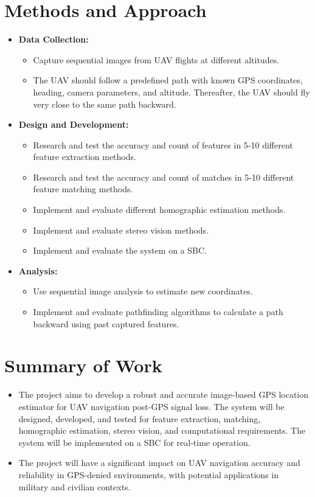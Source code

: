\section{Methods and Approach}
\begin{itemize}
    \item \textbf{Data Collection:}
    \begin{itemize}
        \item Capture sequential images from UAV flights at different altitudes.
        \item The UAV should follow a predefined path with known GPS coordinates, heading, camera parameters, and altitude. Thereafter, the UAV should fly very close to the same path backward.
    \end{itemize}
    \item \textbf{Design and Development:}
    \begin{itemize}
        \item Research and test the accuracy and count of features in 5-10 different feature extraction methods. 
        \item Research and test the accuracy and count of matches in 5-10 different feature matching methods.
        \item Implement and evaluate different homographic estimation methods. 
        \item Implement and evaluate stereo vision methods.
        \item Implement and evaluate the system on a SBC.
    \end{itemize}
    \item \textbf{Analysis:}
    \begin{itemize}
        \item Use sequential image analysis to estimate new coordinates.
        \item Implement and evaluate pathfinding algorithms to calculate a path backward using past captured features.
    \end{itemize}
\end{itemize}


\section{Summary of Work}
\begin{itemize}
    \item The project aims to develop a robust and accurate image-based GPS location estimator for UAV navigation post-GPS signal loss. The system will be designed, developed, and tested for feature extraction, matching, homographic estimation, stereo vision, and computational requirements. The system will be implemented on a SBC for real-time operation.
    \item The project will have a significant impact on UAV navigation accuracy and reliability in GPS-denied environments, with potential applications in military and civilian contexts.
    
\end{itemize}



